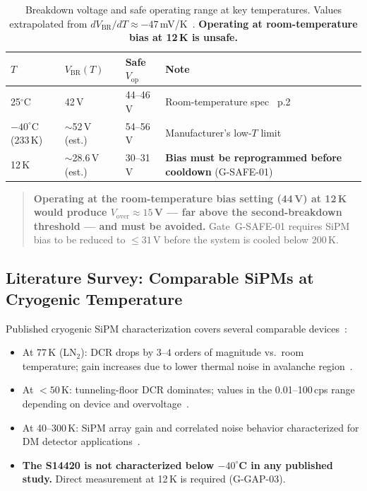 \begin{table}[ht]
\centering
\caption{Breakdown voltage and safe operating range at key temperatures.
  Values extrapolated from $dV_\mathrm{BR}/dT \approx -47$\,mV/K~\cite{Liu2022SiPMLN2}.
  \textbf{Operating at room-temperature bias at 12\,K is unsafe.}}
\label{tab:vbr_vs_T}
\small
\begin{tabular}{@{}p{2.5cm}p{2.8cm}p{2.5cm}p{5cm}@{}}
\toprule
$T$ & $V_\mathrm{BR}(T)$ & Safe $V_\mathrm{op}$ & Note \\
\midrule
25$^\circ$C & 42\,V & 44--46\,V &
  Room-temperature spec~\cite{S14420datasheet} p.2 \\
$-40^\circ$C (233\,K) & $\sim$52\,V (est.) & 54--56\,V &
  Manufacturer's low-$T$ limit~\cite{S14420datasheet} \\
12\,K & $\sim$28.6\,V (est.) & 30--31\,V &
  \textbf{Bias must be reprogrammed before cooldown} (G-SAFE-01) \\
\bottomrule
\end{tabular}
\end{table}

\begin{quote}
\textbf{Operating at the room-temperature bias setting (44\,V) at 12\,K would produce
$V_\mathrm{over} \approx 15$\,V --- far above the second-breakdown threshold ---
and must be avoided.} Gate~G-SAFE-01 requires SiPM bias to be reduced to
$\leq\!31$\,V before the system is cooled below 200\,K.
\end{quote}

\subsection{Literature Survey: Comparable SiPMs at Cryogenic Temperature}

Published cryogenic SiPM characterization covers several comparable
devices~\cite{SiPMcryoArrays2025,SiPMcryoSubmeV2025,Liu2022SiPMLN2}:
\begin{itemize}
  \item At 77\,K (LN$_2$): DCR drops by $3$--$4$ orders of magnitude vs.\ room temperature;
    gain increases due to lower thermal noise in avalanche region~\cite{Liu2022SiPMLN2}.
  \item At $< 50$\,K: tunneling-floor DCR dominates; values in the
    0.01--100\,cps range depending on device and overvoltage~\cite{SiPMcryoSubmeV2025}.
  \item At 40--300\,K: SiPM array gain and correlated noise behavior characterized
    for DM detector applications~\cite{SiPMcryoArrays2025}.
  \item \textbf{The S14420 is not characterized below $-40^\circ$C in any published
    study.} Direct measurement at 12\,K is required (G-GAP-03).
\end{itemize}
